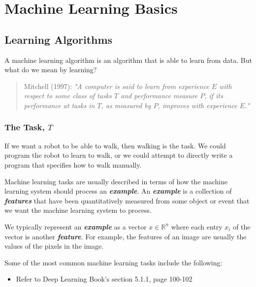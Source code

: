 \documentclass{report}
\begin{document}
\chapter{Machine Learning Basics}

\section{Learning Algorithms}
A machine learning algorithm is an algorithm that is able to learn from data. But what do we mean by learning?

\begin{quotation}
\noindent Mitchell (1997): \textit{"A computer is said to learn from experience $E$ with respect to some class of tasks $T$ and performance measure $P$, if its performance at tasks in $T$, as measured by $P$, improves with experience $E$."}
\end{quotation}

\subsection{The Task, $T$}
\noindent If we want a robot to be able to walk, then walking is the task. We could program the robot to learn to walk, or we could attempt to directly write a program that specifies how to walk manually.\newline

\noindent Machine learning tasks are usually described in terms of how the machine learning system should process an \textit{\textbf{example}}. An \textbf{\textit{example}} is a collection of \textbf{\textit{features}} that have been quantitatively measured from some object or event that we want the machine learning system to process. 

\noindent We typically represent an \textbf{\textit{example}} as a vector $x \in \mathbb{R}^n$ where each entry $x_i$ of the vector is another \textbf{\textit{feature}}. For example, the features of an image are usually the values of the pixels in the image.\newline

\noindent Some of the most common machine learning tasks include the following:\newline
\begin{itemize}
	\item Refer to Deep Learning Book's section 5.1.1, page 100-102
\end{itemize}
\end{document}
